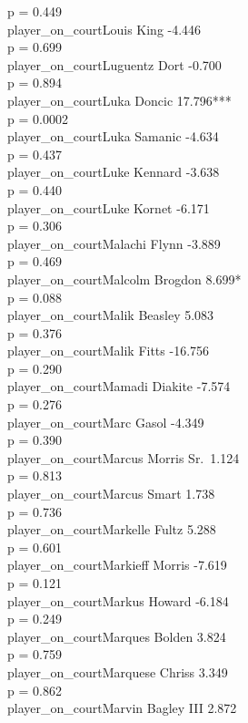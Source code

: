 \documentclass[
  landscape]{article}
\begin{document}
p = 0.449\\
player\_on\_courtLouis King -4.446\\
p = 0.699\\
player\_on\_courtLuguentz Dort -0.700\\
p = 0.894\\
player\_on\_courtLuka Doncic 17.796***\\
p = 0.0002\\
player\_on\_courtLuka Samanic -4.634\\
p = 0.437\\
player\_on\_courtLuke Kennard -3.638\\
p = 0.440\\
player\_on\_courtLuke Kornet -6.171\\
p = 0.306\\
player\_on\_courtMalachi Flynn -3.889\\
p = 0.469\\
player\_on\_courtMalcolm Brogdon 8.699*\\
p = 0.088\\
player\_on\_courtMalik Beasley 5.083\\
p = 0.376\\
player\_on\_courtMalik Fitts -16.756\\
p = 0.290\\
player\_on\_courtMamadi Diakite -7.574\\
p = 0.276\\
player\_on\_courtMarc Gasol -4.349\\
p = 0.390\\
player\_on\_courtMarcus Morris Sr.~1.124\\
p = 0.813\\
player\_on\_courtMarcus Smart 1.738\\
p = 0.736\\
player\_on\_courtMarkelle Fultz 5.288\\
p = 0.601\\
player\_on\_courtMarkieff Morris -7.619\\
p = 0.121\\
player\_on\_courtMarkus Howard -6.184\\
p = 0.249\\
player\_on\_courtMarques Bolden 3.824\\
p = 0.759\\
player\_on\_courtMarquese Chriss 3.349\\
p = 0.862\\
player\_on\_courtMarvin Bagley III 2.872\\
\end{document}
